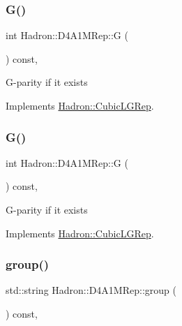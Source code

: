 \subsubsection{\texorpdfstring{G()}{G()}\hspace{0.1cm}{\footnotesize\ttfamily [2/3]}}
{\footnotesize\ttfamily int Hadron\+::\+D4\+A1\+M\+Rep\+::G (\begin{DoxyParamCaption}{ }\end{DoxyParamCaption}) const\hspace{0.3cm}{\ttfamily [inline]}, {\ttfamily [virtual]}}

G-\/parity if it exists 

Implements \mbox{\hyperlink{structHadron_1_1CubicLGRep_ace26f7b2d55e3a668a14cb9026da5231}{Hadron\+::\+Cubic\+L\+G\+Rep}}.

\mbox{\label{structHadron_1_1D4A1MRep_af3514ad54f3b71a3e233360843f8d189}} 
\subsubsection{\texorpdfstring{G()}{G()}\hspace{0.1cm}{\footnotesize\ttfamily [3/3]}}
{\footnotesize\ttfamily int Hadron\+::\+D4\+A1\+M\+Rep\+::G (\begin{DoxyParamCaption}{ }\end{DoxyParamCaption}) const\hspace{0.3cm}{\ttfamily [inline]}, {\ttfamily [virtual]}}

G-\/parity if it exists 

Implements \mbox{\hyperlink{structHadron_1_1CubicLGRep_ace26f7b2d55e3a668a14cb9026da5231}{Hadron\+::\+Cubic\+L\+G\+Rep}}.

\mbox{\label{structHadron_1_1D4A1MRep_a6329fe3f65d0c5a6538aa917500428b7}} 
\subsubsection{\texorpdfstring{group()}{group()}\hspace{0.1cm}{\footnotesize\ttfamily [1/3]}}
{\footnotesize\ttfamily std\+::string Hadron\+::\+D4\+A1\+M\+Rep\+::group (\begin{DoxyParamCaption}{ }\end{DoxyParamCaption}) const\hspace{0.3cm}{\ttfamily [inline]}, {\ttfamily [virtual]}}

